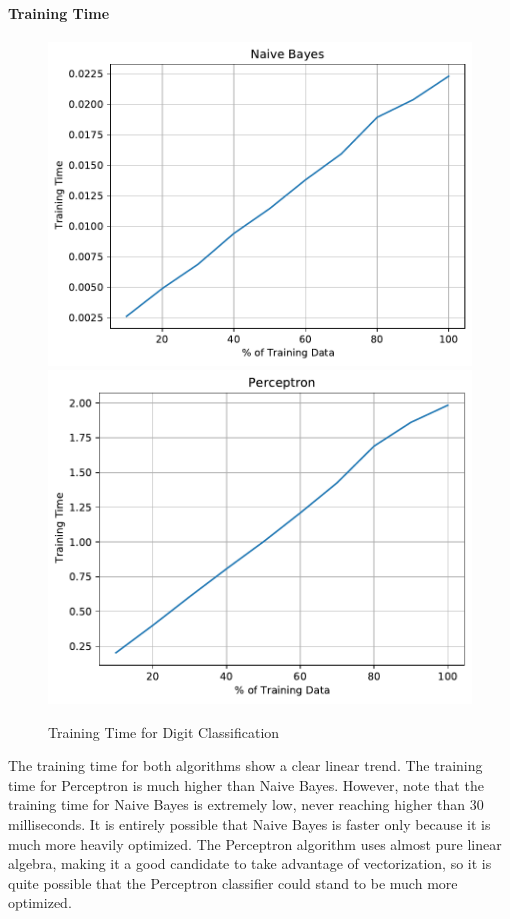 \documentclass{article}
\begin{document}
  \paragraph{Training Time}
  \begin{figure}[H]
  \includegraphics[width=0.45\linewidth]{figures/Naive Bayes_time_DIGIT.pdf}\hfill
  \includegraphics[width=0.45\linewidth]{figures/Perceptron_time_DIGIT.pdf}\hfill
  \caption{Training Time for Digit Classification}
  \end{figure}
  The training time for both algorithms show a clear linear trend.
  The training time for Perceptron is much higher than Naive Bayes. 
  However, note that the training time for Naive Bayes is extremely low, never reaching higher than 30 milliseconds.
  It is entirely possible that Naive Bayes is faster only because it is much more heavily optimized.
  The Perceptron algorithm uses almost pure linear algebra, making it a good candidate to take advantage of vectorization, so it is quite possible that the Perceptron classifier could stand to be much more optimized.
\end{document}
